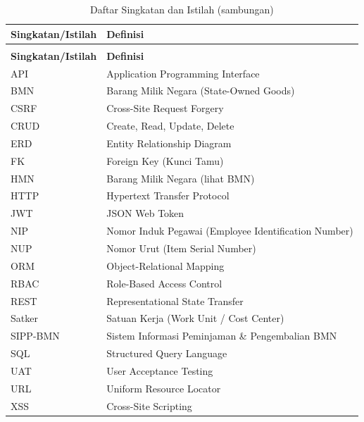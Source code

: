 \documentclass[
  12pt,
  a4paper,
  oneside,
  final
]{report}
\begin{document}
\begin{longtable}[!htbp]{p{3.5cm} p{9cm}}
  \caption{Daftar Singkatan dan Istilah}
  \label{tab:glossary} \\

  \toprule
  \textbf{Singkatan/Istilah} & \textbf{Definisi} \\
  \midrule
  \endfirsthead

  \caption[]{Daftar Singkatan dan Istilah (sambungan)} \\
  \toprule
  \textbf{Singkatan/Istilah} & \textbf{Definisi} \\
  \midrule
  \endhead

  \bottomrule
  \endfoot

  API        & Application Programming Interface \\
  BMN        & Barang Milik Negara (State-Owned Goods) \\
  CSRF       & Cross-Site Request Forgery \\
  CRUD       & Create, Read, Update, Delete \\
  ERD        & Entity Relationship Diagram \\
  FK         & Foreign Key (Kunci Tamu) \\
  HMN        & Barang Milik Negara (lihat BMN) \\
  HTTP       & Hypertext Transfer Protocol \\
  JWT        & JSON Web Token \\
  NIP        & Nomor Induk Pegawai (Employee Identification Number) \\
  NUP        & Nomor Urut (Item Serial Number) \\
  ORM        & Object-Relational Mapping \\
  RBAC       & Role-Based Access Control \\
  REST       & Representational State Transfer \\
  Satker     & Satuan Kerja (Work Unit / Cost Center) \\
  SIPP-BMN   & Sistem Informasi Peminjaman \& Pengembalian BMN \\
  SQL        & Structured Query Language \\
  UAT        & User Acceptance Testing \\
  URL        & Uniform Resource Locator \\
  XSS        & Cross-Site Scripting \\
\end{longtable}

\clearpage
{}
\end{document}
